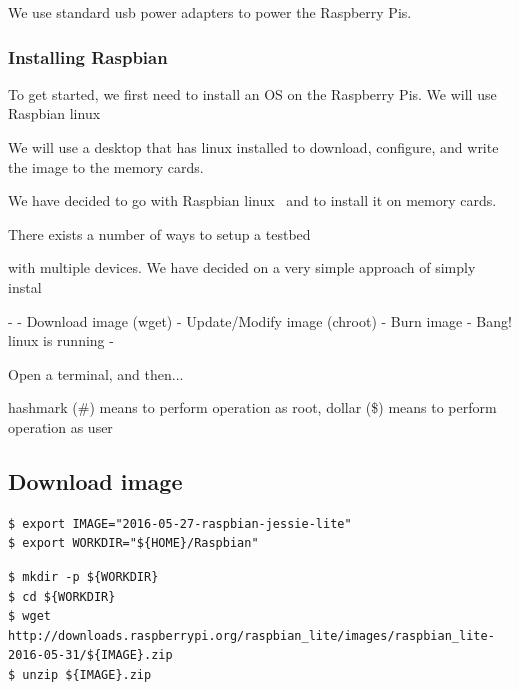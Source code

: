 We use standard usb power adapters to power the Raspberry Pis.

\subsubsection{Installing Raspbian}

To get started, we first need to install an \ac{OS} on the
Raspberry Pis. We will use Raspbian linux~\cite{raspbian}

We will use a desktop that has linux installed to download,
configure, and write the image to the memory cards.


We have decided to go with Raspbian linux~\cite{raspbian} and
to install it on memory cards.



There exists a number of ways to setup a testbed 

with multiple devices. We
have decided on a very simple approach of simply instal


- 
- Download image (wget)
- Update/Modify image (chroot)
- Burn image
- Bang! linux is running
- 

Open a terminal, and then...

hashmark (\#) means to perform operation as root, dollar (\$) means to perform operation as user

\subsection{Download image}

\begin{lstlisting}[] 
$ export IMAGE="2016-05-27-raspbian-jessie-lite"
$ export WORKDIR="${HOME}/Raspbian"
\end{lstlisting}
\FloatBarrier



\begin{lstlisting}[] 
$ mkdir -p ${WORKDIR}
$ cd ${WORKDIR}
$ wget http://downloads.raspberrypi.org/raspbian_lite/images/raspbian_lite-2016-05-31/${IMAGE}.zip
$ unzip ${IMAGE}.zip
\end{lstlisting}
\FloatBarrier

